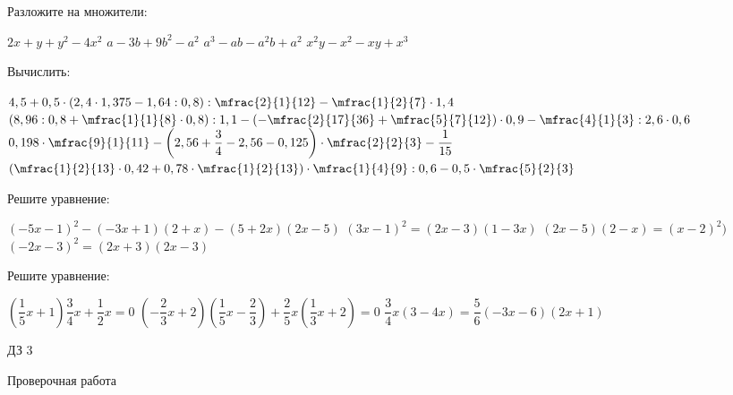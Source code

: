 \begin{homework}[number=2]
	\begin{listofex}
		\item Разложите на множители:
		\begin{itasks}[1]
			\task \(2x+y+y^2-4x^2\)
			\task \(a-3b+9b^2-a^2\)
			\task \(a^3-ab-a^2b+a^2\)
			\task \(x^2y-x^2-xy+x^3\)
		\end{itasks}
		\item Вычислить:
		\begin{itasks}[1]
			\task \( 4,5 + 0,5 \cdot (2,4 \cdot 1,375 - 1,64 : 0,8) : \mfrac{2}{1}{12} - \mfrac{1}{2}{7} \cdot 1,4 \)
			\task \( \left(  8,96 : 0,8 + \mfrac{1}{1}{8} \cdot 0,8 \right) : 1,1 - \left( - \mfrac{2}{17}{36} + \mfrac{5}{7}{12} \right) \cdot 0,9 - \mfrac{4}{1}{3} : 2,6 \cdot 0,6 \)
			\task \( 0,198 \cdot \mfrac{9}{1}{11} - \left(  2,56 + \dfrac{3}{4} - 2,56 - 0,125 \right) \cdot \mfrac{2}{2}{3} - \dfrac{1}{15} \)
			\task \( \left( \mfrac{1}{2}{13} \cdot 0,42 + 0,78 \cdot \mfrac{1}{2}{13} \right) \cdot \mfrac{1}{4}{9} : 0,6 - 0,5 \cdot \mfrac{5}{2}{3} \)
		\end{itasks}
		\item Решите уравнение:
		\begin{itasks}[1]
			\task \( (-5x-1)^2 - (-3x+1)(2+x)-(5+2x)(2x-5) \)
			\task \( (3x-1)^2=(2x-3)(1-3x) \)
			\task \( (2x-5)(2-x)=(x-2)^2) \)
			\task \( (-2x-3)^2=(2x+3)(2x-3) \)
		\end{itasks}
		\item Решите уравнение:
		\begin{itasks}[1]
			\task \( (\dfrac{1}{5}x+1)\dfrac{3}{4}x+\dfrac{1}{2}x=0 \)
			\task \( (-\dfrac{2}{3}x+2)(\dfrac{1}{5}x-\dfrac{2}{3})+ \dfrac{2}{5}x (\dfrac{1}{3}x+2)=0 \)
			\task \( \dfrac{3}{4}x(3-4x)=\dfrac{5}{6}(-3x-6)(2x+1) \)
		\end{itasks} 
	\end{listofex}
\end{homework}

\begin{homework}[number=3]
	\begin{listofex}
		\item ДЗ 3
	\end{listofex}
\end{homework}

\begin{exam}
	\begin{listofex}
		\item Проверочная работа
	\end{listofex}
\end{exam}
